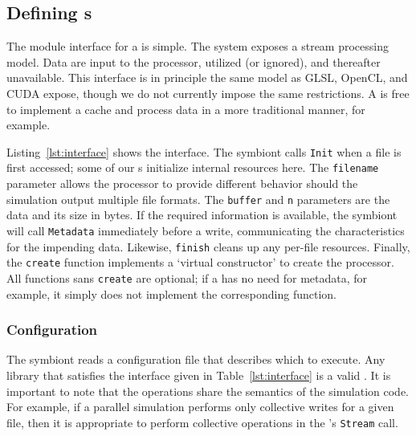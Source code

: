 
\subsection{Defining \freeprocessor{}s}

The module interface for a \freeprocessor{} is simple.  The system
exposes a stream processing model.  Data are input to the processor,
utilized (or ignored), and thereafter unavailable.  This interface is
in principle the same model as GLSL, OpenCL, and CUDA expose, though we do not
currently impose the same restrictions.  A \freeprocessor{} is free to
implement a cache and process data in a more traditional manner, for
example.

Listing~\ref{lst:interface} shows the \freeprocessor{} interface.
The symbiont calls \texttt{Init} when a file is first accessed; some of
our \freeprocessor{}s initialize internal resources here.  The
\texttt{filename} parameter allows the processor to provide different
behavior should the simulation output multiple file formats.  The
\texttt{buffer} and \texttt{n} parameters are the data and its size in
bytes.  If the required information is available, the symbiont will call
\texttt{Metadata} immediately before a write, communicating the
characteristics for the impending data.  Likewise,
\texttt{finish} cleans up
any per-file resources.  Finally, the \texttt{create} function
implements a `virtual constructor' to create the processor.
All functions sans \texttt{create} are optional; if a
\freeprocessor{} has no need for metadata, for example, it simply does
not implement the corresponding function.

\begin{minipage}{\linewidth}

\vspace{-0.01em}
\end{minipage}

\subsubsection{Configuration}

The symbiont reads a configuration file that describes
which \freeprocessor{}
to execute.  Any library that satisfies the interface given in
Table~\ref{lst:interface} is a valid \freeprocessor{}.  It is important
to note that the operations share the semantics of the simulation code.
For example, if a parallel simulation performs only collective writes
for a given file, then it is appropriate to perform
collective operations in the \freeprocessor{}'s \texttt{Stream} call.

